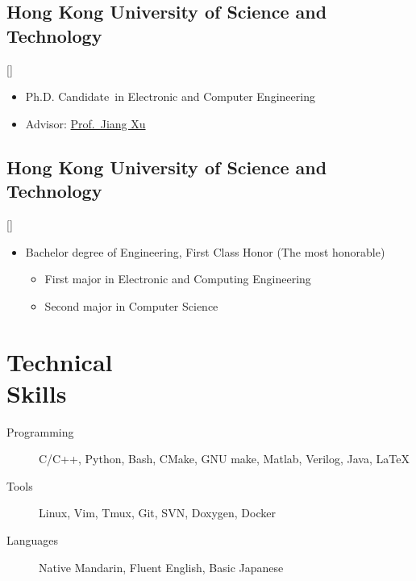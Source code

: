 \documentclass{mycv}
\begin{document}
\subsection{Hong Kong University of Science and Technology}[]
\vspace{-\parskip}%
\begin{itemize}[label={}]
	\item Ph.D. Candidate\ in Electronic and Computer Engineering 
	\item Advisor: \href{https://eexu.home.ece.ust.hk/}{Prof.~Jiang Xu}
\end{itemize}

\subsection{Hong Kong University of Science and Technology}[]
\vspace{-\parskip}%
\begin{itemize}[label={}]
	\item Bachelor degree of Engineering, First Class Honor (The most honorable)
	\begin{itemize}[label=\textbullet]
      \item First major in Electronic and Computing Engineering
      \item Second major in Computer Science
	\end{itemize}
\end{itemize}

\section{Technical \\ Skills}

\begin{description}
	
  \item[Programming] C/C++, Python, Bash, CMake, GNU make, Matlab, Verilog, Java, \LaTeX
  \item[Tools] Linux, Vim, Tmux, Git, SVN, Doxygen, Docker %
  \item[Languages] Native Mandarin, Fluent English, Basic Japanese
\end{description}
\end{document}
